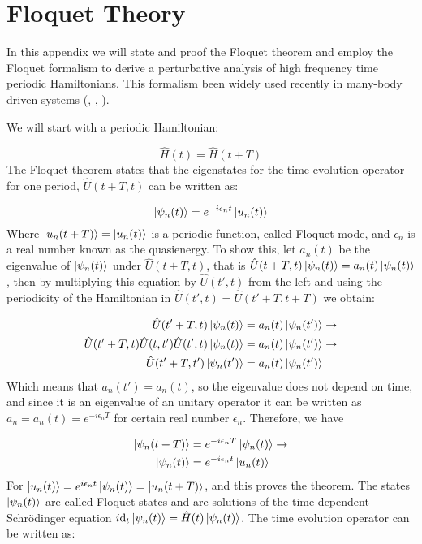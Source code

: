 \chapter{Floquet Theory}
\label{APE}
In this appendix we will state and proof the Floquet theorem and employ the Floquet formalism to derive a perturbative analysis of high frequency time periodic Hamiltonians. This formalism been widely used recently in many-body driven systems (\cite{Desbuquois2017}, \cite{Bordia2017}, \cite{Gorg2018}).

We will start with a periodic Hamiltonian:

\begin{equation}
\hat{H}(t) = \hat{H}(t+T)
\end{equation}
The Floquet theorem states that the eigenstates for the time evolution operator for one period, $\hat{U}(t+T,t)$ can be written as:

\begin{equation}
\label{FloquetMode}
\ket{\psi_n(t)} = e^{-i \epsilon_n t}\ket{u_n(t)}
\end{equation}
Where $\ket{u_n(t+T)} = \ket{u_n(t)}$ is a periodic function, called Floquet mode, and $\epsilon_n$ is a real number known as the quasienergy. To show this, let $a_n(t)$ be the eigenvalue of $\ket{\psi_n(t)}$ under $\hat{U}(t+T,t)$, that is $\hat{U}(t+T,t)\ket{\psi_n(t)} = a_n(t)\ket{\psi_n(t)}$, then by multiplying this equation by $\hat{U}(t',t)$ from the left and using the periodicity of the Hamiltonian in $\hat{U}(t',t) = \hat{U}(t'+T,t+T)$ we obtain:

\begin{align*}
\hat{U}(t'+T,t) \ket{\psi_n(t)} &= a_n(t)\ket{\psi_n(t')} \rightarrow \\
\hat{U}(t'+T,t) \hat{U}(t,t')\hat{U}(t',t) \ket{\psi_n(t)} &= a_n(t)\ket{\psi_n(t')} \rightarrow \\
\hat{U}(t'+T,t') \ket{\psi_n(t')} &= a_n(t)\ket{\psi_n(t')}
\end{align*}
Which means that $a_n(t') = a_n(t)$, so the eigenvalue does not depend on time, and since it is an eigenvalue of an unitary operator it can be written as $a_n = a_n(t) = e^{-i\epsilon_nT}$ for certain real number $\epsilon_n$. Therefore, we have 

\begin{align*}
\ket{\psi_n(t+T)} &= e^{-i\epsilon_nT} \ket{\psi_n(t)} \rightarrow \\
\ket{\psi_n(t)} &= e^{-i\epsilon_nt} \ket{u_n(t)}
\end{align*}
For $\ket{u_n(t)} = e^{i\epsilon_nt} \ket{\psi_n(t)} = \ket{u_n(t+T)}$, and this proves the theorem. The states $\ket{\psi_n(t)}$ are called Floquet states and are solutions of the time dependent Schr\"{o}dinger equation $i\text{d}_t\ket{\psi_n(t)} = \hat{H}(t)\ket{\psi_n(t)}$. The time evolution operator can be written as:

